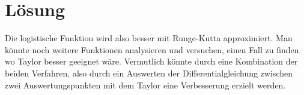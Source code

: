 %
%
%
\section{Lösung
\label{taylor:section:loesung}}
Die logistische Funktion wird also besser mit Runge-Kutta approximiert.
Man könnte noch weitere Funktionen analysieren und versuchen, einen Fall zu finden wo Taylor besser geeignet wäre.
Vermutlich könnte durch eine Kombination der beiden Verfahren, also durch ein Auswerten der Differentialgleichung zwischen zwei Auswertungspunkten mit dem Taylor eine Verbesserung erzielt werden.



